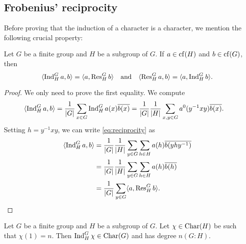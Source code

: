 \subsection{Frobenius' reciprocity}

Before proving that the induction of a character is a character, we  mention the following crucial property:

\begin{theorem}
    Let $G$ be a finite group and $H$ be a subgroup of $G$. 
    If $a\in\operatorname{cf}(H)$ and $b\in\operatorname{cf}(G)$, then
    \[
    \langle\operatorname{Ind}_H^Ga,b\rangle=\langle a,\operatorname{Res}_H^Gb\rangle
    \quad\text{and}\quad
    \langle\operatorname{Res}_H^Ga,b\rangle=\langle a,\operatorname{Ind}_H^Gb\rangle.
    \]
\end{theorem}

\begin{proof}
    We only need to prove the first equality. We compute 
    \begin{equation}
    \label{eq:reciprocity}
    \begin{aligned}
        \langle\operatorname{Ind}_H^Ga,b\rangle 
        &= \frac{1}{|G|}\sum_{x\in G}\operatorname{Ind}_H^Ga(x)\overline{b(x)}
        = \frac{1}{|G|}\frac{1}{|H|}\sum_{x,y\in G}a^0(y^{-1}xy)\overline{b(x)}.
    \end{aligned}
    \end{equation}
    Setting $h=y^{-1}xy$, 
    we can write \eqref{eq:reciprocity} as 
    \begin{align*}
        \langle\operatorname{Ind}_H^Ga,b\rangle
        &=\frac{1}{|G|}\frac{1}{|H|}\sum_{y\in G}\sum_{h\in H}a(h)\overline{b(yhy^{-1})}\\
        &=\frac{1}{|G|}\frac{1}{|H|}\sum_{y\in G}\sum_{h\in H}a(h)\overline{b(h)}\\
        &=\frac{1}{|G|}\sum_{y\in G}\langle a,\operatorname{Res}_H^Gb\rangle.\qedhere 
    \end{align*}
\end{proof}

\begin{corollary}
\label{cor:reciprocity}
    Let $G$ be a finite group and $H$ be a subgroup of $G$. 
    Let $\chi\in\operatorname{Char}(H)$ be such that 
    $\chi(1)=n$. Then 
    $\operatorname{Ind}_H^G\chi\in\operatorname{Char}(G)$ and 
    has degree $n(G:H)$. 
\end{corollary}


